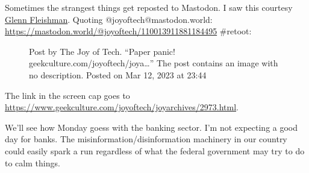 Sometimes the strangest things get reposted to Mastodon. I saw this
courtesy \href{https://twit.social/@glennf}{Glenn Fleishman}. Quoting
@joyoftech@mastodon.world:
\url{https://mastodon.world/@joyoftech/110013911881184495} \#retoot:

\begin{figure}
\centering
{}
\caption{Post by The Joy of Tech. ``Paper panic!
geekculture.com/joyoftech/joya\ldots{}'' The post contains an image with
no description. Posted on Mar 12, 2023 at 23:44}
\end{figure}

The link in the screen cap goes to
\url{https://www.geekculture.com/joyoftech/joyarchives/2973.html}.

We'll see how Monday goess with the banking sector. I'm not expecting a
good day for banks. The misinformation/disinformation machinery in our
country could easily spark a run regardless of what the federal
government may try to do to calm things.
